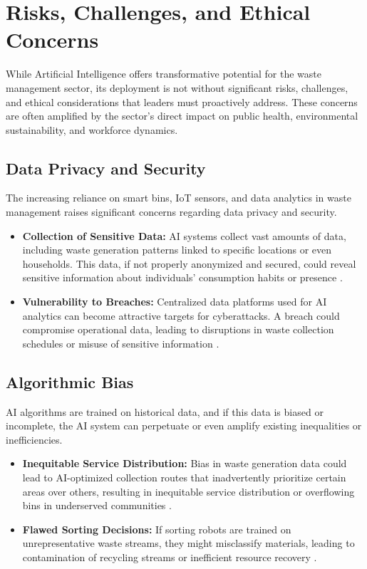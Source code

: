\section{Risks, Challenges, and Ethical Concerns}

While Artificial Intelligence offers transformative potential for the waste management sector, its deployment is not without significant risks, challenges, and ethical considerations that leaders must proactively address. These concerns are often amplified by the sector's direct impact on public health, environmental sustainability, and workforce dynamics.

\subsection{Data Privacy and Security}
The increasing reliance on smart bins, IoT sensors, and data analytics in waste management raises significant concerns regarding data privacy and security.
\begin{itemize}
    \item \textbf{Collection of Sensitive Data:} AI systems collect vast amounts of data, including waste generation patterns linked to specific locations or even households. This data, if not properly anonymized and secured, could reveal sensitive information about individuals' consumption habits or presence \cite{SustainabilityDirectory_Risks_1}.
    \item \textbf{Vulnerability to Breaches:} Centralized data platforms used for AI analytics can become attractive targets for cyberattacks. A breach could compromise operational data, leading to disruptions in waste collection schedules or misuse of sensitive information \cite{WasteManaged_Risks}.
\end{itemize}

\subsection{Algorithmic Bias}
AI algorithms are trained on historical data, and if this data is biased or incomplete, the AI system can perpetuate or even amplify existing inequalities or inefficiencies.
\begin{itemize}
    \item \textbf{Inequitable Service Distribution:} Bias in waste generation data could lead to AI-optimized collection routes that inadvertently prioritize certain areas over others, resulting in inequitable service distribution or overflowing bins in underserved communities \cite{SustainabilityDirectory_Risks_2}.
    \item \textbf{Flawed Sorting Decisions:} If sorting robots are trained on unrepresentative waste streams, they might misclassify materials, leading to contamination of recycling streams or inefficient resource recovery \cite{Neuroject_Risks}.
\end{itemize}

